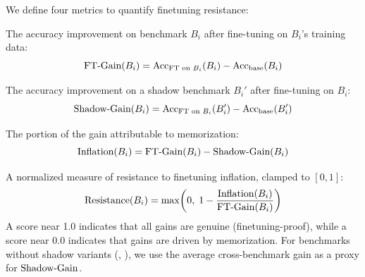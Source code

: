 We define four metrics to quantify finetuning resistance:

 The accuracy improvement on benchmark $B_i$ after fine-tuning on $B_i$'s training data:
\begin{equation}
    \text{FT-Gain}(B_i) = \text{Acc}_{\text{FT on } B_i}(B_i) - \text{Acc}_{\text{base}}(B_i)
\end{equation}

 The accuracy improvement on a shadow benchmark $B_i'$ after fine-tuning on $B_i$:
\begin{equation}
    \text{Shadow-Gain}(B_i) = \text{Acc}_{\text{FT on } B_i}(B_i') - \text{Acc}_{\text{base}}(B_i')
\end{equation}

 The portion of the gain attributable to memorization:
\begin{equation}
    \text{Inflation}(B_i) = \text{FT-Gain}(B_i) - \text{Shadow-Gain}(B_i)
\end{equation}

 A normalized measure of resistance to finetuning inflation, clamped to $[0, 1]$:
\begin{equation}
    \text{Resistance}(B_i) = \max\!\left(0,\; 1 - \frac{\text{Inflation}(B_i)}{\text{FT-Gain}(B_i)}\right)
\label{eq:resistance}
\end{equation}
A score near 1.0 indicates that all gains are genuine (finetuning-proof), while a score near 0.0 indicates that gains are driven by memorization. For benchmarks without shadow variants (\wino, \arc), we use the average cross-benchmark gain as a proxy for $\text{Shadow-Gain}$.
